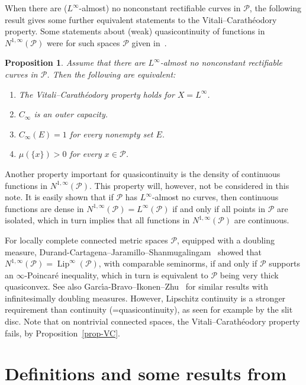 \documentclass[a4paper,twoside]{article}
\theoremstyle{propositional}
\newtheorem{prop}[thm]{Proposition}
\theoremstyle{descriptive}
\newcommand{\Cinfty}{{C_\infty}}
\DeclareMathOperator{\Lip}{Lip}
\newcommand{\Ninfty}{N^{1,\infty}}
\newcommand{\NinftyP}{N^{1,\infty}(\P)}
\renewcommand{\P}{\mathcal{P}}
\numberwithin{equation}{section}
\begin{document}
When there are ($L^\infty$-almost) no  nonconstant rectifiable curves
in $\P$,
the following result gives some further equivalent statements
to the Vitali--Carath\'eodory property.
Some statements about (weak) quasicontinuity of functions in $\Ninfty(\P)$
were for such spaces $\P$ given in~\cite[Theorem~6.2]{BBLMaly}. 


\begin{prop} \label{prop-VC-no-curve}
Assume that 
there are 
$L^\infty$-almost no nonconstant rectifiable curves
in $\P$.
Then the following are equivalent:
\begin{enumerate}
\item \label{c-VC}
The Vitali--Carath\'eodory property holds for $X=L^\infty$.
\item  \label{c-outer}
$\Cinfty$ is an outer capacity.
\item \label{c-E}
$\Cinfty(E)=1$ for every nonempty set $E$.
\item \label{c-mu}
$\mu(\{x\})>0$ for every $x\in\P$.
\end{enumerate}
\end{prop}

Another property important for quasicontinuity is the 
density of continuous functions in $\Ninfty(\P)$.
This property will, however, not be considered in this note.
It is easily shown that if $\P$ has $L^\infty$-almost no curves, then
continuous functions are dense in $\Ninfty(\P)=L^\infty(\P)$ if
and only if all points in $\P$ are isolated,
which in turn implies that
all functions in $\Ninfty(\P)$ are continuous.

For locally complete connected metric spaces $\P$,
equipped with a doubling measure,
Durand-Cartagena--Jaramillo--Shan\-mu\-ga\-lin\-gam~\cite[Theorem~3.1]{DCJS16}
showed that $\NinftyP=\Lip^\infty(\P)$, with comparable seminorms,
 if and only if $\P$ supports an $\infty$-Poincar\'e inequality, 
which  in turn is equivalent
 to $\P$ being very thick quasiconvex.
See also  Garc\'\i a-Bravo--Ikonen--Zhu~\cite{GB-I-Z} for similar results with infinitesimally doubling measures.
However, Lipschitz continuity is a stronger requirement than 
continuity (=quasicontinuity), as seen for example by the slit disc.
Note that on nontrivial connected spaces, the Vitali--Carath\'eodory property 
fails,  by Proposition~\ref{prop-VC}.





 

\section{Definitions and some results from \texorpdfstring{\cite{BBLMaly}}{[1]}}
\label{sect-def}
\end{document}
